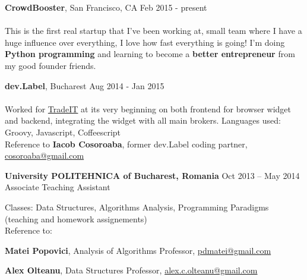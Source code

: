 \documentclass[margin,line]{resume}
\begin{document}
\begin{resume}
    \vspace{1.2mm}\textbf{CrowdBooster}, San Francisco, CA
        \hfill Feb 2015 - present\vspace{1mm}\\
    \selectfont{Software Developer}\vspace{1.2mm}\\
    {\fontsize{2.65mm}{1em}\selectfont
     This is the first real startup that I've been working at, small team where I have a huge influence over everything, I love how fast everything is going! I'm doing \textbf{Python programming} and learning to become a \textbf{better entrepreneur} from my good founder friends.
    }

    \vspace{1.2mm}\textbf{dev.Label}, Bucharest
        \hfill Aug 2014 - Jan 2015\vspace{1mm}\\
    \selectfont{Frontend \& Backend Developer}\vspace{1.2mm}\\
    {\fontsize{2.65mm}{1em}\selectfont
      Worked for \href{https://www.trade.it/}{TradeIT} at its very beginning on both frontend for browser widget and backend, integrating the widget with all main brokers.
      Languages used: Groovy, Javascript, Coffeescript\\
      Reference to \textbf{Iacob Cosoroaba}, former dev.Label coding partner, \href{mailto:cosoroaba@gmail.com}{cosoroaba@gmail.com}
     }

    \vspace{1.2mm}\textbf{University POLITEHNICA of Bucharest, Romania}
        \hfill Oct 2013 -- May 2014\vspace{1mm}\\
        Associate Teaching Assistant\vspace{1.2mm}\\
    {\fontsize{2.65mm}{1em}\selectfont
      Classes: Data Structures, Algorithms Analysis, Programming Paradigms (teaching and homework assignements)\\
      Reference to:
      \begin{list2}
          \item \textbf{Matei Popovici}, Analysis of Algorithms Professor, \href{mailto:pdmatei@gmail.com}{pdmatei@gmail.com}
          \item \textbf{Alex Olteanu}, Data Structures Professor, \href{mailto:alex.c.olteanu@gmail.com}{alex.c.olteanu@gmail.com}
      \end{list2}
    }


\end{resume}
\end{document}
